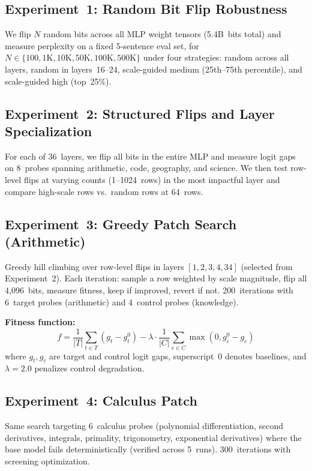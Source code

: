 \documentclass[11pt,a4paper]{article}
\begin{document}
\subsection{Experiment~1: Random Bit Flip Robustness}

We flip $N$ random bits across all MLP weight tensors (5.4B~bits total)
and measure perplexity on a fixed 5-sentence eval set, for
$N \in \{100, 1\text{K}, 10\text{K}, 50\text{K}, 100\text{K}, 500\text{K}\}$
under four strategies: random across all layers, random in layers~16--24,
scale-guided medium (25th--75th percentile), and scale-guided high
(top~25\%).

\subsection{Experiment~2: Structured Flips and Layer Specialization}

For each of 36~layers, we flip all bits in the entire MLP and measure
logit gaps on 8~probes spanning arithmetic, code, geography, and
science. We then test row-level flips at varying counts (1--1024~rows)
in the most impactful layer and compare high-scale rows vs.\ random
rows at 64~rows.

\subsection{Experiment~3: Greedy Patch Search (Arithmetic)}

Greedy hill climbing over row-level flips in layers $[1, 2, 3, 4, 34]$
(selected from Experiment~2). Each iteration: sample a row weighted by
scale magnitude, flip all 4,096~bits, measure fitness, keep if improved,
revert if not. 200~iterations with 6~target probes (arithmetic) and
4~control probes (knowledge).

\textbf{Fitness function:}
\begin{equation}
  f = \frac{1}{|T|}\sum_{t \in T} (g_t - g_t^0)
    - \lambda \cdot \frac{1}{|C|}\sum_{c \in C} \max(0, g_c^0 - g_c)
\end{equation}
where $g_t, g_c$ are target and control logit gaps, superscript~$0$
denotes baselines, and $\lambda = 2.0$ penalizes control degradation.

\subsection{Experiment~4: Calculus Patch}

Same search targeting 6~calculus probes (polynomial differentiation,
second derivatives, integrals, primality, trigonometry, exponential
derivatives) where the base model fails deterministically (verified
across 5~runs). 300~iterations with screening optimization.
\end{document}
